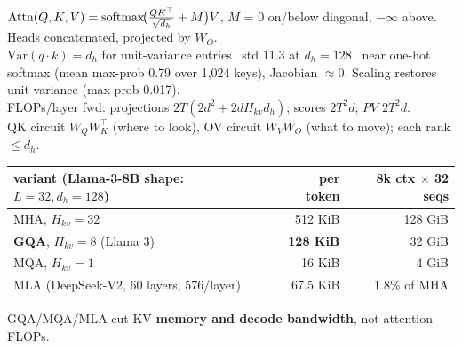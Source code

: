 \begin{mem}[Attention]
$\mathrm{Attn}(Q,K,V)=\mathrm{softmax}\!\big(\tfrac{QK^\top}{\sqrt{d_h}}+M\big)V$, $M$ = 0 on/below diagonal, $-\infty$ above. Heads concatenated, projected by $W_O$.\\
$\mathrm{Var}(q\cdot k)=d_h$ for unit-variance entries \ra\ std 11.3 at $d_h{=}128$ \ra\ near one-hot softmax (mean max-prob 0.79 over 1{,}024 keys), Jacobian $\approx0$. Scaling restores unit variance (max-prob 0.017).\\
FLOPs/layer fwd: projections $2T(2d^2+2dH_{kv}d_h)$; scores $2T^2d$; $PV$ $2T^2d$.\\
QK circuit $W_QW_K^\top$ (where to look), OV circuit $W_VW_O$ (what to move); each rank $\le d_h$.
\end{mem}

\begin{center}
\end{center}

\begin{mem}
\begin{tabularx}{\linewidth}{@{}Lrr@{}}
\toprule
variant (Llama-3-8B shape: $L{=}32,d_h{=}128$) & per token & 8k ctx $\times$ 32 seqs\\\midrule
MHA, $H_{kv}{=}32$ & 512 KiB & 128 GiB\\
\textbf{GQA}, $H_{kv}{=}8$ (Llama 3) & \textbf{128 KiB} & 32 GiB\\
MQA, $H_{kv}{=}1$ & 16 KiB & 4 GiB\\
MLA (DeepSeek-V2, 60 layers, 576/layer) & 67.5 KiB & 1.8\% of MHA\\\bottomrule
\end{tabularx}
GQA/MQA/MLA cut KV \textbf{memory and decode bandwidth}, not attention FLOPs.
\end{mem}

